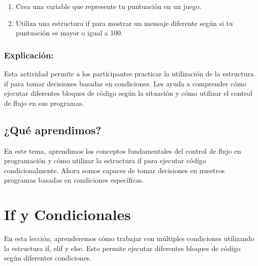 \documentclass[
  a4paper,
  DIV=11,
  numbers=noendperiod,
  onepage,
  openany]{scrreprt}
\providecommand{\tightlist}{%
  \setlength{\itemsep}{0pt}\setlength{\parskip}{0pt}}\usepackage{longtable,booktabs,array}
\begin{document}
\begin{tcolorbox}[enhanced jigsaw, toptitle=1mm, toprule=.15mm, title=\textcolor{quarto-callout-tip-color}{\faLightbulb}\hspace{0.5em}{Actividad Práctica}, colbacktitle=quarto-callout-tip-color!10!white, opacitybacktitle=0.6, titlerule=0mm, colback=white, left=2mm, bottomrule=.15mm, breakable, bottomtitle=1mm, rightrule=.15mm, colframe=quarto-callout-tip-color-frame, arc=.35mm, leftrule=.75mm, coltitle=black, opacityback=0]

\begin{enumerate}
\def\labelenumi{\arabic{enumi}.}
\tightlist
\item
  Crea una variable que represente tu puntuación en un juego.
\item
  Utiliza una estructura if para mostrar un mensaje diferente según si
  tu puntuación es mayor o igual a 100.
\end{enumerate}

\end{tcolorbox}

\subsection{Explicación:}\label{explicaciuxf3n-17}

Esta actividad permite a los participantes practicar la utilización de
la estructura if para tomar decisiones basadas en condiciones. Les ayuda
a comprender cómo ejecutar diferentes bloques de código según la
situación y cómo utilizar el control de flujo en sus programas.

\section{¿Qué aprendimos?}\label{quuxe9-aprendimos-3}

En este tema, aprendimos los conceptos fundamentales del control de
flujo en programación y cómo utilizar la estructura if para ejecutar
código condicionalmente. Ahora somos capaces de tomar decisiones en
nuestros programas basadas en condiciones específicas.

\chapter{If y Condicionales}\label{if-y-condicionales}

En esta lección, aprenderemos cómo trabajar con múltiples condiciones
utilizando la estructura if, elif y else. Esto permite ejecutar
diferentes bloques de código según diferentes condiciones.
\end{document}
